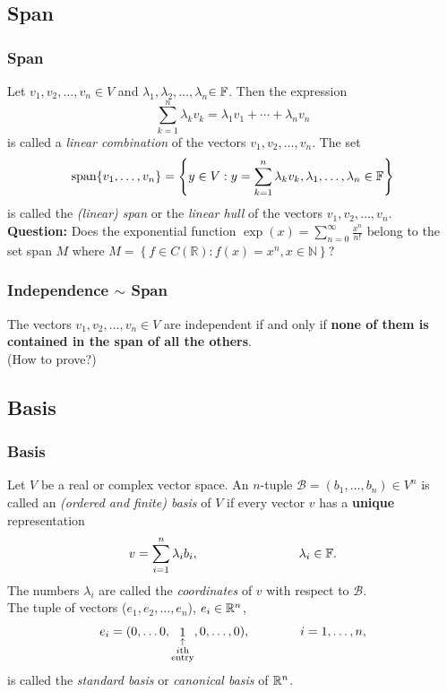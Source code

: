 \documentclass[12pt, t]{beamer}
\renewcommand{\emph}[1]{{\color{Turquoise3}\textsl{#1}}}
\newcommand{\myseries}[2]{$#1_1,#1_2,\dots,#1_#2$}
\newcommand{\nullspace}{~\\[15pt]}
\begin{document}
\subsection{Span}
\begin{frame}
    \frametitle{Span}
    Let \myseries{v}{n}$\in V$ and \myseries{\lambda}{n}$\in\mathbb{F}$. Then the expression
    \begin{equation*}
        \sum_{k=1}^{n}\lambda_kv_k=\lambda_1v_1+\cdots+\lambda_nv_n
    \end{equation*}
    is called a \emph{linear combination} of the vectors \myseries{v}{n}. The set
    \[\text{span}\{v_1,\ldots,v_n\}=\left\{y\in V:y=\sum_{k=1}^{n}\lambda_kv_k,\lambda_1,\ldots,\lambda_n\in\mathbb{F}\right\}\]
    is called the \emph{(linear) span} or the \emph{linear hull} of the vectors \myseries{v}{n}.\nullspace
    \textbf{Question: } Does the exponential function $\exp (x)=\sum_{n=0}^{\infty} \frac{x^{n}}{n !}$ belong to the set span $M$ where $M=\left\{f \in C(\mathbb{R}): f(x)=x^{n}, x \in \mathbb{N}\right\} ?$

\end{frame}

\begin{frame}
    \frametitle{Independence $\sim$ Span}
    The vectors \myseries{v}{n}$\in V$ are independent if and only if
    \textbf{none of them is contained in the span of all the others}.
    \\[15pt]
    (How to prove?)
\end{frame}

\subsection{Basis}
\begin{frame}
    \frametitle{Basis}
    Let $V$ be a real or complex vector space. An $n$-tuple $\mathcal{B}=(b_1,\ldots,b_n)\in V^n$ is called an \emph{(ordered and finite) basis} of $V$
    if every vector $v$ has a \textbf{unique} representation
    \begin{equation}
        v=\sum_{i=1}^{n}\lambda_ib_i,\qquad\qquad\qquad\qquad\lambda_i\in\mathbb{F}.\label{basis}
    \end{equation}
    The numbers $\lambda_i$ are called the \emph{coordinates} of $v$ with respect to $\mathcal{B}$.
    \\[15pt]
    The tuple of vectors (\myseries{e}{n}), $e_i\in\mathbb{R}^n$,
    \begin{equation*}
        e_i=(0,\ldots 0,\mathop{1}_{\begin{subarray}{c}
                \uparrow\\  i\text{th}\\ \text{entry}\end{subarray}},0,\ldots,0),\qquad\qquad i=1,\ldots,n,
    \end{equation*}
    is called the \emph{standard basis} or \emph{canonical basis} of $\mathbb{R}^n$.
\end{frame}
\end{document}
